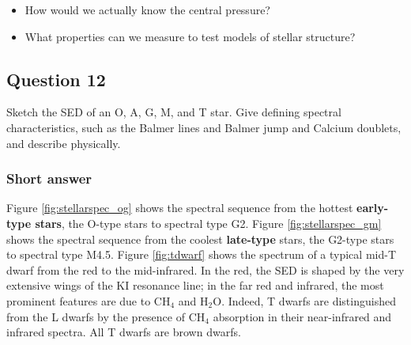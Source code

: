 \documentclass[a4paper,10pt]{article}
\begin{document}
\begin{itemize}
    \item How would we actually know the central pressure?
    \item What properties can we measure to test models of stellar structure?
\end{itemize}


\newpage
\subsection{Question 12}

Sketch the SED of an O, A, G, M, and T star. Give defining spectral characteristics, such as the Balmer lines and Balmer jump and Calcium doublets, and describe physically.

\subsubsection{Short answer}

{\noindent}Figure \ref{fig:stellarspec_og} shows the spectral sequence from the hottest \textbf{early-type stars}, the O-type stars to spectral type G2. Figure \ref{fig:stellarspec_gm} shows the spectral sequence from the coolest \textbf{late-type} stars, the G2-type stars to spectral type M4.5. Figure \ref{fig:tdwarf} shows the spectrum of a typical mid-T dwarf from the red to the mid-infrared. In the red, the SED is shaped by the very extensive wings of the KI resonance line; in the far red and infrared, the most prominent features are due to CH$_4$ and H$_2$O. Indeed, T dwarfs are distinguished from the L dwarfs by the presence of CH$_4$ absorption in their near-infrared and infrared spectra. All T dwarfs are brown dwarfs.
\end{document}

